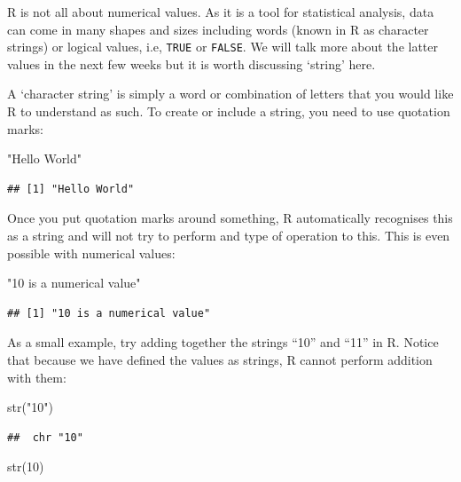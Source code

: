 \documentclass[
]{book}
\newenvironment{Shaded}{\begin{snugshade}}{\end{snugshade}}
\newcommand{\DecValTok}[1]{\textcolor[rgb]{0.00,0.00,0.81}{#1}}
\newcommand{\FunctionTok}[1]{\textcolor[rgb]{0.00,0.00,0.00}{#1}}
\newcommand{\NormalTok}[1]{#1}
\newcommand{\StringTok}[1]{\textcolor[rgb]{0.31,0.60,0.02}{#1}}
\theoremstyle{definition}
\theoremstyle{definition}
\theoremstyle{definition}
\theoremstyle{definition}
\theoremstyle{remark}
\begin{document}
R is not all about numerical values. As it is a tool for statistical analysis, data can come in many shapes and sizes including words (known in R as character strings) or logical values, i.e, \texttt{TRUE} or \texttt{FALSE}. We will talk more about the latter values in the next few weeks but it is worth discussing `string' here.

A `character string' is simply a word or combination of letters that you would like R to understand as such. To create or include a string, you need to use quotation marks:

\begin{Shaded}
\begin{Highlighting}[]
\StringTok{"Hello World"}
\end{Highlighting}
\end{Shaded}

\begin{verbatim}
## [1] "Hello World"
\end{verbatim}

Once you put quotation marks around something, R automatically recognises this as a string and will not try to perform and type of operation to this. This is even possible with numerical values:

\begin{Shaded}
\begin{Highlighting}[]
\StringTok{"10 is a numerical value"}
\end{Highlighting}
\end{Shaded}

\begin{verbatim}
## [1] "10 is a numerical value"
\end{verbatim}

As a small example, try adding together the strings ``10'' and ``11'' in R. Notice that because we have defined the values as strings, R cannot perform addition with them:

\begin{Shaded}
\begin{Highlighting}[]
\FunctionTok{str}\NormalTok{(}\StringTok{"10"}\NormalTok{)}
\end{Highlighting}
\end{Shaded}

\begin{verbatim}
##  chr "10"
\end{verbatim}

\begin{Shaded}
\begin{Highlighting}[]
\FunctionTok{str}\NormalTok{(}\DecValTok{10}\NormalTok{)}
\end{Highlighting}
\end{Shaded}
\end{document}
